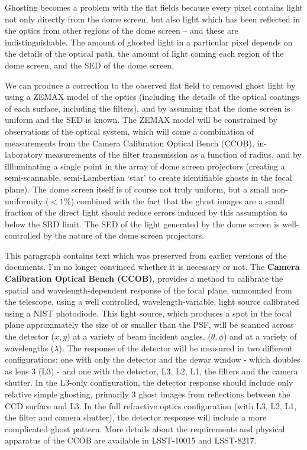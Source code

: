 \documentclass[12pt,preprint]{aastex}
\begin{document}
Ghosting becomes a problem with the flat fields because every pixel
contains light not only directly from the dome screen, but also light
which has been reflected in the optics from other regions of the dome
screen -- and these are indistinguishable.  The amount of ghosted
light in a particular pixel depends on the details of the optical
path, the amount of light coming each region of the dome screen, and
the SED of the dome screen.

We can produce a correction to the observed flat field to removed
ghost light by using a ZEMAX model of the optics (including the
details of the optical coatings of each surface, including the
filters), and by assuming that the dome screen is uniform and the SED
is known. The ZEMAX model will be constrained by observations of the
optical system, which will come a combination of measurements from the
Camera Calibration Optical Bench (CCOB), in-laboratory measurements of
the filter transmission as a function of radius, and by illluminating
a single point in the array of dome screen projectors (creating a
semi-scannable, semi-Lambertian `star' to create identifiable ghosts
in the focal plane).  The dome screen itself is of course not truly
uniform, but a small non-uniformity ($<1\%$) combined with the fact
that the ghost images are a small fraction of the direct light should
reduce errors induced by this assumption to below the SRD limit. The
SED of the light generated by the dome screen is well-controlled by
the nature of the dome screen projectors.

This paragraph contains text which was preserved from earlier versions
of the documents. I'm no longer convinced whether it is necessary or
not.  The {\bf Camera Calibration Optical Bench (CCOB)}, provides a
method to calibrate the spatial and wavelength-dependent response of
the focal plane, unmounted from the telescope, using a well
controlled, wavelength-variable, light source calibrated using a NIST
photodiode. This light source, which produces a spot in the focal
plane approximately the size of or smaller than the PSF, will be
scanned across the detector ($x,y$) at a variety of beam incident
angles, ($\theta,\phi$) and at a variety of wavelengths ($\lambda$).
The response of the detector will be measured in two different
configurations: one with only the detector and the dewar window -
which doubles as lens 3 (L3) - and one with the detector, L3, L2, L1,
the filters and the camera shutter. In the L3-only configuration, the
detector response should include only relative simple ghosting,
primarily 3 ghost images from reflections between the CCD surface and
L3. In the full refractive optics configuration (with L3, L2, L1, the
filter and camera shutter), the detector response will include a more
complicated ghost pattern.  More details about the requirements and
physical apparatus of the CCOB are available in LSST-10015 and
LSST-8217.
\end{document}
